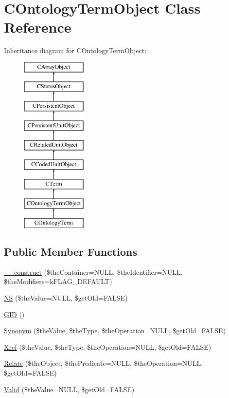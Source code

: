 \hypertarget{class_c_ontology_term_object}{\section{C\-Ontology\-Term\-Object Class Reference}
\label{class_c_ontology_term_object}
}
Inheritance diagram for C\-Ontology\-Term\-Object\-:\begin{figure}[H]
\begin{center}
\leavevmode
\includegraphics[height=9.000000cm]{class_c_ontology_term_object}
\end{center}
\end{figure}
\subsection*{Public Member Functions}
\begin{DoxyCompactItemize}
\item 
\hyperlink{class_c_ontology_term_object_af1fb502088538ad7372719c20f73bc5c}{\-\_\-\-\_\-construct} (\$the\-Container=N\-U\-L\-L, \$the\-Identifier=N\-U\-L\-L, \$the\-Modifiers=k\-F\-L\-A\-G\-\_\-\-D\-E\-F\-A\-U\-L\-T)
\item 
\hyperlink{class_c_ontology_term_object_a109414a9abe98e3997be238addfda6cf}{N\-S} (\$the\-Value=N\-U\-L\-L, \$get\-Old=F\-A\-L\-S\-E)
\item 
\hyperlink{class_c_ontology_term_object_ab1a4d21bb56a8a6cf3f77f595d776267}{G\-I\-D} ()
\item 
\hyperlink{class_c_ontology_term_object_a96f637a86e1823dc61b2135a00ddfe26}{Synonym} (\$the\-Value, \$the\-Type, \$the\-Operation=N\-U\-L\-L, \$get\-Old=F\-A\-L\-S\-E)
\item 
\hyperlink{class_c_ontology_term_object_a32bb224840f965d3c2680895b52847c4}{Xref} (\$the\-Value, \$the\-Type, \$the\-Operation=N\-U\-L\-L, \$get\-Old=F\-A\-L\-S\-E)
\item 
\hyperlink{class_c_ontology_term_object_ab023a6d801c93d939683da4fe823e0fb}{Relate} (\$the\-Object, \$the\-Predicate=N\-U\-L\-L, \$the\-Operation=N\-U\-L\-L, \$get\-Old=F\-A\-L\-S\-E)
\item 
\hyperlink{class_c_ontology_term_object_a41c7f8fbe4e561b744277fc62ba18912}{Valid} (\$the\-Value=N\-U\-L\-L, \$get\-Old=F\-A\-L\-S\-E)
\end{DoxyCompactItemize}

